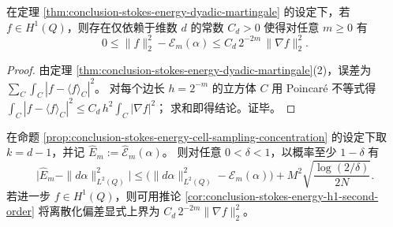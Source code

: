 \begin{corollary}[\(H^1\) 正则性下的二阶尺度误差控制]\label{cor:conclusion-stokes-energy-h1-second-order}
在定理 \ref{thm:conclusion-stokes-energy-dyadic-martingale} 的设定下，若 \(f\in H^1(Q)\)，则存在仅依赖于维数 \(d\) 的常数 \(C_d>0\) 使得对任意 \(m\ge 0\) 有
\[
0\le \|f\|_2^2-\mathcal E_m(\alpha)\le C_d\,2^{-2m}\,\|\nabla f\|_2^2.
\]
\end{corollary}
\begin{proof}
由定理 \ref{thm:conclusion-stokes-energy-dyadic-martingale}(2)，误差为 \(\sum_C\int_C|f-\langle f\rangle_C|^2\)。
对每个边长 \(h=2^{-m}\) 的立方体 \(C\) 用 Poincar\'e 不等式得
\(
\int_C|f-\langle f\rangle_C|^2\le C_d\,h^2\int_C|\nabla f|^2
\)；
求和即得结论。证毕。
\end{proof}

\begin{corollary}\label{cor:conclusion-stokes-energy-topcell-confidence}
在命题 \ref{prop:conclusion-stokes-energy-cell-sampling-concentration} 的设定下取 \(k=d-1\)，并记 \(\widehat E_m:=\widehat{\mathcal E}_m(\alpha)\)。
则对任意 \(0<\delta<1\)，以概率至少 \(1-\delta\) 有
\[
\bigl|\widehat E_m-\|d\alpha\|_{L^2(Q)}^2\bigr|
\le
\bigl(\|d\alpha\|_{L^2(Q)}^2-\mathcal E_m(\alpha)\bigr)
 + M^2\sqrt{\frac{\log(2/\delta)}{2N}}.
\]
若进一步 \(f\in H^1(Q)\)，则可用推论 \ref{cor:conclusion-stokes-energy-h1-second-order} 将离散化偏差显式上界为 \(C_d\,2^{-2m}\|\nabla f\|_2^2\)。
\end{corollary}

